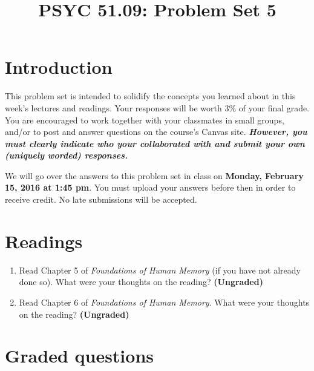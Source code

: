 \documentclass[11pt]{article}
\title{PSYC 51.09: Problem Set 5}
\date{}
\begin{document}
\maketitle
\vspace{-0.75in}
\section*{Introduction}
This problem set is intended to solidify the concepts you learned about in this week's lectures and readings.  Your responses will be worth 3\% of your final grade.  You are encouraged to work together with your classmates in small groups, and/or to post and answer questions on the course’s Canvas site.  \textbf{\textit{However, you must clearly indicate who your collaborated with and submit your own (uniquely worded) responses.}}

We will go over the answers to this problem set in class on \textbf{Monday, February 15, 2016 at 1:45 pm}.  You must upload your answers before then in order to receive credit.  No late submissions will be accepted.

\section*{Readings}
\begin{enumerate}
\item Read Chapter 5 of \textit{Foundations of Human Memory} (if you
  have not already done so).  What were your thoughts on the reading?
  \textbf{(Ungraded)}

\item Read Chapter 6 of \textit{Foundations of Human Memory}.  What were your thoughts on the reading?
  \textbf{(Ungraded)}
\end{enumerate}

\section*{Graded questions}
\end{document}
